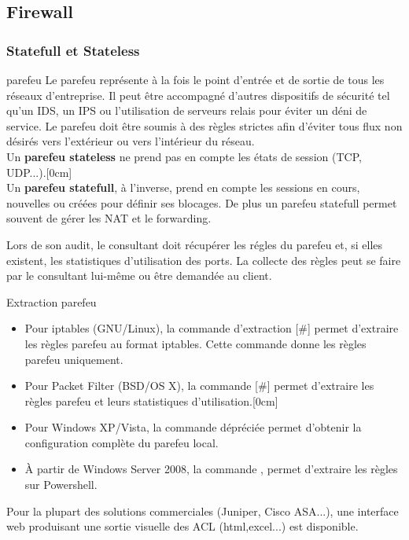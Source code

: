 \documentclass[twoside,a4paper,12pt,titlepage]{book}
\newcommand{\MarginPar}[2]{\marginnote{\scriptsize #1}[#2]}
\begin{document}
\subsection{Firewall\label{Firewall}}
\subsubsection{Statefull et Stateless}
\begin{Define}{parefeu}
	Le parefeu représente à la fois le point d'entrée et de sortie de tous les réseaux d'entreprise. Il peut être accompagné d'autres dispositifs de sécurité tel qu'un \gls{IDS}, un \gls{IPS} ou l'utilisation de serveurs relais pour éviter un déni de service. Le parefeu doit être soumis à des règles strictes afin d'éviter tous flux non désirés vers l'extérieur ou vers l'intérieur du réseau.\\
	Un \textbf{parefeu stateless} ne prend pas en compte les états de session (TCP, UDP...).\MarginPar{\textbf{Parefeu réseau}}{0cm}\\
	Un \textbf{parefeu statefull}, à l'inverse, prend en compte les sessions en cours, nouvelles ou créées pour définir ses blocages. De plus un parefeu statefull permet souvent de gérer les \gls{NAT} et le forwarding.
\end{Define}
	Lors de son audit, le consultant doit récupérer les régles du parefeu et, si elles existent, les statistiques d'utilisation des ports. La collecte des règles peut se faire par le consultant lui-même ou être demandée au client.
\begin{FlagConsole}{Extraction parefeu}
	\begin{itemize}
		\item Pour iptables (GNU/Linux), la commande d'extraction
			[\#] permet d'extraire les règles parefeu au format 
			iptables. Cette commande donne les règles parefeu uniquement.
		\item Pour Packet Filter (BSD/OS X), la commande 
			[\#] permet d'extraire les règles parefeu et leurs 
			statistiques d'utilisation.\MarginPar{\textbf{Règles des Parefeu}}{0cm}
		\item Pour Windows XP/Vista, la commande
			dépréciée  permet d'obtenir la configuration 
			complète du parefeu local.
		\item À partir de Windows Server 2008,
			la commande ,
			permet d'extraire les règles sur Powershell.
	\end{itemize}
	Pour la plupart des solutions commerciales (Juniper, Cisco ASA...), une interface web produisant une sortie visuelle des \gls{ACL} (html,excel...) est disponible.
\end{FlagConsole}
\end{document}
